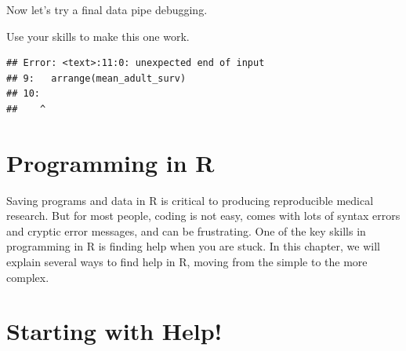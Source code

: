\documentclass[
]{book}
\newenvironment{Shaded}{\begin{snugshade}}{\end{snugshade}}
\newcommand{\DataTypeTok}[1]{\textcolor[rgb]{0.13,0.29,0.53}{#1}}
\newcommand{\DecValTok}[1]{\textcolor[rgb]{0.00,0.00,0.81}{#1}}
\newcommand{\KeywordTok}[1]{\textcolor[rgb]{0.13,0.29,0.53}{\textbf{#1}}}
\newcommand{\NormalTok}[1]{#1}
\newcommand{\OperatorTok}[1]{\textcolor[rgb]{0.81,0.36,0.00}{\textbf{#1}}}
\newcommand{\StringTok}[1]{\textcolor[rgb]{0.31,0.60,0.02}{#1}}
\begin{document}
Now let's try a final data pipe debugging.

Use your skills to make this one work.

\begin{Shaded}
\end{Shaded}

\begin{verbatim}
## Error: <text>:11:0: unexpected end of input
## 9:   arrange(mean_adult_surv)
## 10:   
##    ^
\end{verbatim}

\hypertarget{programming-in-r}{%
\section{Programming in R}\label{programming-in-r}}

Saving programs and data in R is critical to producing reproducible medical research. But for most people, coding is not easy, comes with lots of syntax errors and cryptic error messages, and can be frustrating. One of the key skills in programming in R is finding help when you are stuck.
In this chapter, we will explain several ways to find help in R, moving from the simple to the more complex.

\hypertarget{starting-with-help}{%
\section{Starting with Help!}\label{starting-with-help}}
\end{document}
